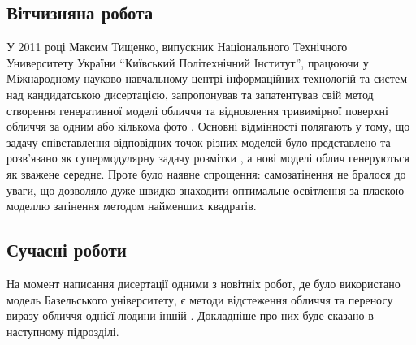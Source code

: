\subsection{Вітчизняна робота}

У 2011 році Максим Тищенко,
випускник Національного Технічного Университету України
``Київський Політехнічний Інститут'',
працюючи у Міжнародному науково-навчальному центрі
інформаційних технологій та систем над кандидатською дисертацією,
запропонував та запатентував
свій метод створення генеративної моделі обличчя та відновлення
тривимірної поверхні обличчя за одним або кількома фото \cite{tyshchenko:2011}.
Основні відмінності полягають у тому,
що задачу співставлення відповідних точок різних моделей
було представлено та розв'язано як супермодулярну
задачу розмітки \cite{Lovasz1983},
а нові моделі облич генеруються як зважене середнє.
Проте було наявне спрощення: самозатінення не бралося до уваги,
що дозволяло дуже швидко знаходити оптимальне освітлення
за пласкою моделлю затінення методом найменших квадратів.

\subsection{Сучасні роботи}

На момент написання дисертації одними з новітніх робот,
де було використано модель Базельського університету,
є методи відстеження обличчя \cite{Saito2016}
та переносу виразу обличчя однієї людини іншій \cite{thies2016face}.
Докладніше про них буде сказано в наступному підрозділі.
